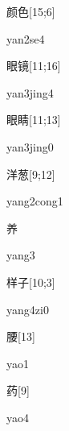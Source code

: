 \begin{verbete}[yan2se4]{颜色}[15;6]
\begin{pronuncia}{yan2se4}
\end{pronuncia}
\end{verbete}

\begin{verbete}{眼镜}[11;16]
\begin{pronuncia}{yan3jing4}
\end{pronuncia}
\end{verbete}

\begin{verbete}{眼睛}[11;13]
\begin{pronuncia}{yan3jing0}
\end{pronuncia}
\end{verbete}

\begin{verbete}{洋葱}[9;12]
\begin{pronuncia}{yang2cong1}
\end{pronuncia}
\end{verbete}

\begin{verbete}[yang3]{养}
\begin{pronuncia}{yang3}
\end{pronuncia}
\end{verbete}

\begin{verbete}[yang4zi0]{样子}[10;3]
\begin{pronuncia}{yang4zi0}
\end{pronuncia}
\end{verbete}

\begin{verbete}[yao1]{腰}[13]
\begin{pronuncia}{yao1}
\end{pronuncia}
\end{verbete}

\begin{verbete}[yao4]{药}[9]
\begin{pronuncia}{yao4}
\end{pronuncia}
\end{verbete}

